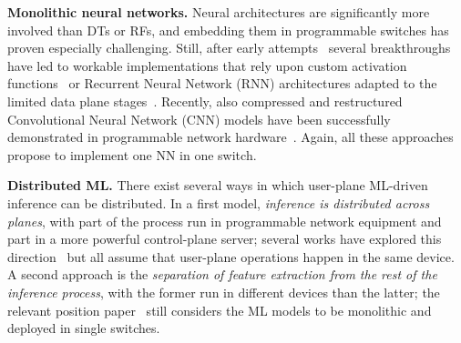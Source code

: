 \documentclass[journal]{IEEEtran}
\theoremstyle{plain} %
\begin{document}
\noindent\textbf{Monolithic neural networks.} Neural architectures are significantly more involved than DTs or RFs, and embedding them in programmable switches has proven especially challenging. Still, after early attempts~\cite{N2Net.2018} several breakthroughs have led to workable implementations that rely upon custom activation functions~\cite{rids-infocom24} or Recurrent Neural Network (RNN) architectures adapted to the limited data plane stages~\cite{brain-on-switch-nsdi24}. Recently, also compressed and restructured Convolutional Neural Network (CNN) models have been successfully demonstrated in programmable network hardware~\cite{quark}.
Again, all these approaches propose to implement one NN in one switch.

\noindent\textbf{Distributed ML.} There exist several ways in which user-plane ML-driven inference can be distributed.
In a first model, \textit{inference is distributed across planes}, with part of the process run in programmable network equipment and part in a more powerful control-plane server; several works have explored this direction~\cite{knowledge_defined_networking,switchML.2021,marina-ton24} but all assume that user-plane operations happen in the same device.
%
A second approach is the \textit{separation of feature extraction from the rest of the inference process}, with the former run in different devices than the latter; the relevant position paper~\cite{bracciale-nativeni22} still considers the ML models to be monolithic and deployed in single switches.
\end{document}
